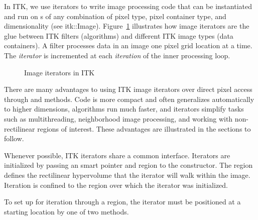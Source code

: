 In ITK, we use iterators to write image processing code that can be
instantiated and run on s of any combination of pixel type,
pixel container type, and dimensionality (see itk::Image).
Figure~\ref{fig:ImageIterators} illustrates how image iterators are the glue
between ITK filters (algorithms) and different ITK image types (data
containers). A filter processes data in an image one pixel grid location at a time.  The
\emph{iterator} is incremented at each \emph{iteration} of the inner processing
loop.  


\begin{figure}
\centering
\caption[Image iterators in ITK]{Image iterators in ITK}
\protect\label{fig:ImageIterators}
\end{figure}

There are many advantages to using ITK image iterators over direct pixel access
through  and  methods.  Code is
more compact and often generalizes automatically to higher dimensions,
algorithms run much faster, and iterators simplify tasks such as
multithreading, neighborhood image processing, and working with non-rectilinear
regions of interest.  These advantages are illustrated in the sections to
follow.


Whenever possible, ITK iterators share a common interface.  Iterators are
initialized by passing an  smart pointer and region to the
constructor.  The region defines the rectilinear hypervolume that the iterator
will walk within the image.  Iteration is confined to the region over which the
iterator was initialized.

To set up for iteration through a region, the iterator must be positioned at a
starting location by one of two methods.

